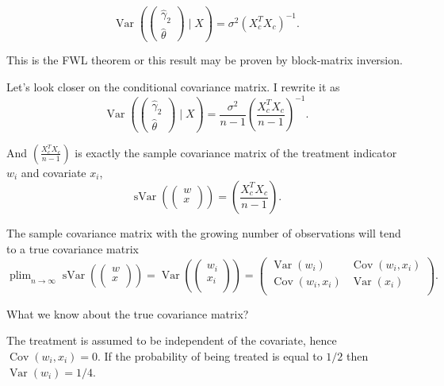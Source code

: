\documentclass[10pt, a4paper]{article}
\DeclareMathOperator*\plim{plim}
\DeclareMathOperator{\Var}{Var}
\DeclareMathOperator{\sVar}{sVar}
\DeclareMathOperator{\Cov}{Cov}
\begin{document}
\[
\Var\left( 
    \begin{pmatrix}    
        \hat \gamma_2 \\
        \hat \theta
    \end{pmatrix}
    \mid X \right) = \sigma^2 (X_c^TX_c)^{-1}.
\]

This is the FWL theorem or this result may be proven by block-matrix inversion. 


Let's look closer on the conditional covariance matrix.
I rewrite it as 
\[
    \Var\left( 
        \begin{pmatrix}    
            \hat \gamma_2 \\
            \hat \theta
        \end{pmatrix}
        \mid X \right) = \frac{\sigma^2}{n-1} \left(\frac{X_c^TX_c}{n-1}\right)^{-1}.        
\]

And $\left(\frac{X_c^TX_c}{n-1}\right)$ is exactly the sample covariance matrix of the treatment 
indicator $w_i$ and covariate $x_i$, 
\[
    \sVar\left(
        \begin{pmatrix}    
            w \\
            x \\
        \end{pmatrix}
    \right) =  \left(\frac{X_c^TX_c}{n-1}\right).    
\]


The sample covariance matrix with the growing number of observations will tend to a true 
covariance matrix 
\[
\plim_{n\to\infty} \sVar\left(
    \begin{pmatrix}    
        w \\
        x \\
    \end{pmatrix}
\right) = 
\Var\left(
    \begin{pmatrix}    
        w_i \\
        x_i \\
    \end{pmatrix}
\right) =     \begin{pmatrix}    
    \Var(w_i) & \Cov(w_i, x_i) \\
    \Cov(w_i, x_i) & \Var(x_i) \\
\end{pmatrix}.
\]

What we know about the true covariance matrix?

The treatment is assumed to be independent of the covariate, hence $\Cov(w_i, x_i) = 0$.
If the probability of being treated is equal to $1/2$ then $\Var(w_i) = 1/4$.
\end{document}
